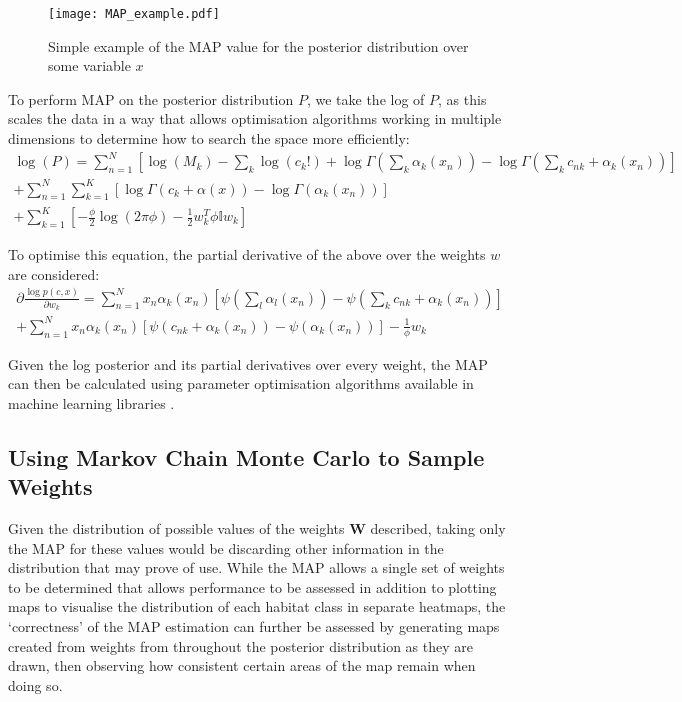\begin{figure}
    \texttt{[image: MAP\_example.pdf]}
    \caption{Simple example of the MAP value for the posterior distribution over some variable $x$}
    \label{fig:MAP-ex}
\end{figure}

To perform MAP on the posterior distribution $P$, we take the log of $P$, as this scales the data in a way that allows optimisation algorithms working in multiple dimensions to determine how to search the space more efficiently:
\begin{multline}
    \log(P) = \sum^N_{n=1} [\log(M_k) - \sum_k \log(c_k!) + \log \Gamma(\sum_k \alpha_k(x_n)) - \log \Gamma(\sum_k c_{nk} + \alpha_k(x_n))] \\
    + \sum^N_{n=1} \sum^K_{k=1} [\log \Gamma(c_k + \alpha(x)) - \log \Gamma(\alpha_k(x_n))] \\
    + \sum^K_{k=1} [-\frac{\phi}{2} \log(2\pi \phi) - \frac{1}{2}w_k^T \phi \mathbb{I} w_k]
\end{multline}

To optimise this equation, the partial derivative of the above over the weights $w$ are considered:
\begin{multline}
    \partial \frac{\log p(c, x)}{\partial w_k} = \sum_{n=1}^N x_n \alpha_k (x_n) [\psi(\sum_l \alpha_l(x_n)) - \psi(\sum_k c_{nk} + \alpha_k(x_n))] \\
    + \sum^N_{n=1} x_n \alpha_k (x_n) [\psi (c_{nk} + \alpha_k(x_n)) - \psi(\alpha_k(x_n))] - \frac{1}{\phi} w_k
\end{multline}


Given the log posterior and its partial derivatives over every weight, the MAP can then be calculated using parameter optimisation algorithms available in machine learning libraries .

\subsection{Using Markov Chain Monte Carlo to Sample Weights}
Given the distribution of possible values of the weights $\mathbf{W}$ described, taking only the MAP for these values would be discarding other information in the distribution that may prove of use. While the MAP allows a single set of weights to be determined that allows performance to be assessed in addition to plotting maps to visualise the distribution of each habitat class in separate heatmaps, the `correctness' of the MAP estimation can further be assessed by generating maps created from weights from throughout the posterior distribution as they are drawn, then observing how consistent certain areas of the map remain when doing so.

